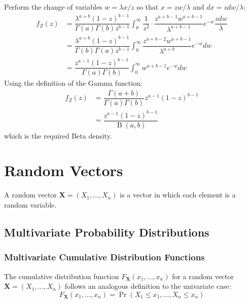 \documentclass[11pt]{report} %
\begin{document}
Perform the change of variables $w = \lambda x/z$ so that $x = zw/\lambda$ and $dx = zdw/\lambda$:
\begin{align}
f_{Z}\left(z\right) &= \dfrac{\lambda^{a+b}\left(1-z\right)^{b-1}}{\Gamma\left(a\right)\Gamma\left(b\right)z^{b-1}}\int_{0}^{\infty}\dfrac{1}{z^{2}}\cdot\dfrac{z^{a+b-1}w^{a+b-1}}{\lambda^{a+b-1}}e^{-w}\dfrac{zdw}{\lambda} \\
&= \dfrac{\lambda^{a+b}\left(1-z\right)^{b-1}}{\Gamma\left(b\right)\Gamma\left(a\right)z^{b-1}}\int_{0}^{\infty}\dfrac{z^{a+b-2}w^{a+b-1}}{\lambda^{a+b}}e^{-w}dw \\
&= \dfrac{z^{a-1}\left(1-z\right)^{b-1}}{\Gamma\left(a\right)\Gamma\left(b\right)}\int_{0}^{\infty}w^{a+b-1}e^{-w}dw
\end{align}
Using the definition of the Gamma function:
\begin{align}
f_{Z}\left(z\right) &= \dfrac{\Gamma\left(a+b\right)}{\Gamma\left(a\right)\Gamma\left(b\right)}z^{a-1}\left(1-z\right)^{b-1} \\
&= \dfrac{z^{a-1}\left(1-z\right)^{b-1}}{\operatorname{B}\left(a,b\right)}
\end{align} 
which is the required Beta density.

\section{Random Vectors}

A random vector $\mathbf{X} = \left(X_{1}, \dots, X_{n}\right)$ is a vector in which each element is a random variable.

\subsection{Multivariate Probability Distributions}

\subsubsection{Multivariate Cumulative Distribution Functions}

The cumulative distribution function $F_{\mathbf{X}}\left(x_{1}, \dots, x_{n}\right)$ for a random vector $\mathbf{X} = \left(X_{1}, \dots, X_{n}\right)$ follows an analogous definition to the univariate case:
\begin{equation}
F_{\mathbf{X}}\left(x_{1}, \dots, x_{n}\right) = \operatorname{Pr}\left(X_{1} \leq x_{1}, \dots, X_{n} \leq x_{n}\right)
\end{equation}
\end{document}
